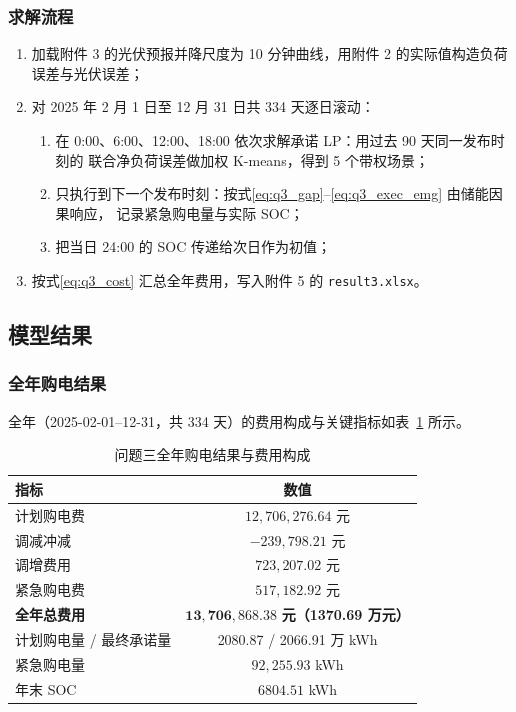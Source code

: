 \documentclass[12pt,a4paper]{article}
\begin{document}
\subsubsection{求解流程}

\begin{enumerate}
    \item 加载附件 3 的光伏预报并降尺度为 10 分钟曲线，用附件 2 的实际值构造负荷误差与光伏误差；
    \item 对 2025 年 2 月 1 日至 12 月 31 日共 334 天逐日滚动：
    \begin{enumerate}
        \item 在 0:00、6:00、12:00、18:00 依次求解承诺 LP：用过去 90 天同一发布时刻的
              联合净负荷误差做加权 K-means，得到 5 个带权场景；
        \item 只执行到下一个发布时刻：按式\eqref{eq:q3_gap}--\eqref{eq:q3_exec_emg} 由储能因果响应，
              记录紧急购电量与实际 SOC；
        \item 把当日 24:00 的 SOC 传递给次日作为初值；
    \end{enumerate}
    \item 按式\eqref{eq:q3_cost} 汇总全年费用，写入附件 5 的 \texttt{result3.xlsx}。
\end{enumerate}

\subsection{模型结果}

\subsubsection{全年购电结果}

全年（2025-02-01--12-31，共 334 天）的费用构成与关键指标如表~\ref{tab:q3-total} 所示。

\begin{table}[htbp]
\centering
\caption{问题三全年购电结果与费用构成}
\label{tab:q3-total}
\begin{tabular}{lc}
\toprule
\textbf{指标} & \textbf{数值} \\
\midrule
计划购电费        & $12{,}706{,}276.64$ 元 \\
调减冲减          & $-239{,}798.21$ 元 \\
调增费用          & $723{,}207.02$ 元 \\
紧急购电费        & $517{,}182.92$ 元 \\
\midrule
\textbf{全年总费用} & $\mathbf{13{,}706{,}868.38}$ \textbf{元（1370.69 万元）} \\
\midrule
计划购电量 / 最终承诺量 & 2080.87 / 2066.91 万 kWh \\
紧急购电量        & $92{,}255.93$ kWh \\
年末 SOC          & $6804.51$ kWh \\
\bottomrule
\end{tabular}
\end{table}
\end{document}
